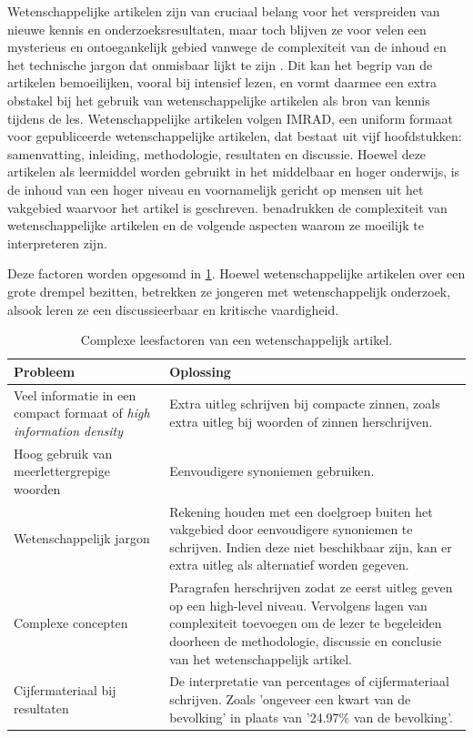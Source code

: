 Wetenschappelijke artikelen zijn van cruciaal belang voor het verspreiden van nieuwe kennis en onderzoeksresultaten, maar toch blijven ze voor velen een mysterieus en ontoegankelijk gebied vanwege de complexiteit van de inhoud en het technische jargon dat onmisbaar lijkt te zijn \autocite{Ball2017}. Dit kan het begrip van de artikelen bemoeilijken, vooral bij intensief lezen, en vormt daarmee een extra obstakel bij het gebruik van wetenschappelijke artikelen als bron van kennis tijdens de les. Wetenschappelijke artikelen volgen IMRAD, een uniform formaat voor gepubliceerde wetenschappelijke artikelen, dat bestaat uit vijf hoofdstukken: samenvatting, inleiding, methodologie, resultaten en discussie. Hoewel deze artikelen als leermiddel worden gebruikt in het middelbaar en hoger onderwijs, is de inhoud van een hoger niveau en voornamelijk gericht op mensen uit het vakgebied waarvoor het artikel is geschreven. \textcite{Pain2016, CAS2021} benadrukken de complexiteit van wetenschappelijke artikelen en de volgende aspecten waarom ze moeilijk te interpreteren zijn.

\medspace

Deze factoren worden opgesomd in \ref{table:scientific-paper-struggles}. Hoewel wetenschappelijke artikelen over een grote drempel bezitten, betrekken ze jongeren met wetenschappelijk onderzoek, alsook leren ze een discussieerbaar en kritische vaardigheid. 

\medspace

\begin{center}
	\begin{table}[H]
	\begin{tabular}{| m{4cm} | m{10cm} |}
		\hline
		\textbf{Probleem} & \textbf{Oplossing} \\
		\hline
		Veel informatie in een compact formaat of \textit{high information density} & Extra uitleg schrijven bij compacte zinnen, zoals extra uitleg bij woorden of zinnen herschrijven. \\
		\hline
		Hoog gebruik van meerlettergrepige woorden & Eenvoudigere synoniemen gebruiken. \\
		\hline
		Wetenschappelijk jargon & Rekening houden met een doelgroep buiten het vakgebied door eenvoudigere synoniemen te schrijven. Indien deze niet beschikbaar zijn, kan er extra uitleg als alternatief worden gegeven. \\
		\hline
		Complexe concepten & Paragrafen herschrijven zodat ze eerst uitleg geven op een high-level niveau. Vervolgens lagen van complexiteit toevoegen om de lezer te begeleiden doorheen de methodologie, discussie en conclusie van het wetenschappelijk artikel. \\ 
		\hline
		Cijfermateriaal bij resultaten & De interpretatie van percentages of cijfermateriaal schrijven. Zoals 'ongeveer een kwart van de bevolking' in plaats van '24.97\% van de bevolking'. \\
		\hline
	\end{tabular}
	\label{table:scientific-paper-struggles}
	\caption{Complexe leesfactoren van een wetenschappelijk artikel.}
	\end{table}
\end{center}

